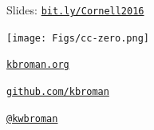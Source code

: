 \documentclass[12pt,t]{beamer}
\begin{document}
\begin{frame}[c]{}

\Large

Slides: \href{http://bit.ly/Cornell2016}{\tt bit.ly/Cornell2016}

\vspace*{-7mm}
\hspace{90mm} \texttt{[image: Figs/cc-zero.png]}

\vspace{10mm}

\href{http://kbroman.org}{\tt kbroman.org}

\vspace{10mm}

\href{https://github.com/kbroman}{\tt github.com/kbroman}

\vspace{10mm}

\href{https://twitter.com/kwbroman}{\tt @kwbroman}


\end{frame}
\end{document}

